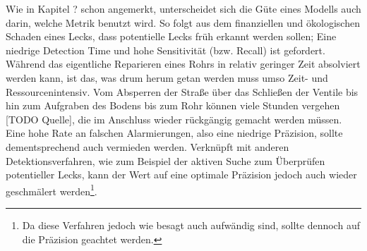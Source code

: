 Wie in Kapitel ? schon angemerkt, unterscheidet sich die Güte eines Modells auch darin, welche Metrik
 benutzt wird. So folgt aus dem finanziellen und ökologischen Schaden eines Lecks, dass potentielle Lecks
 früh erkannt werden sollen; Eine niedrige Detection Time und hohe Sensitivität (bzw. Recall) ist gefordert.
 Während das eigentliche Reparieren eines Rohrs in relativ geringer Zeit absolviert werden kann, ist das, was
 drum herum getan werden muss umso Zeit- und Ressourcenintensiv. Vom Absperren der Straße über das Schließen
 der Ventile bis hin zum Aufgraben des Bodens bis zum Rohr können viele Stunden vergehen [TODO Quelle], die
 im Anschluss wieder rückgängig gemacht werden müssen. Eine hohe Rate an falschen Alarmierungen, also eine
 niedrige Präzision, sollte dementsprechend auch vermieden werden. Verknüpft mit anderen Detektionsverfahren,
 wie zum Beispiel der aktiven Suche zum Überprüfen potentieller Lecks, kann der Wert auf eine optimale Präzision
 jedoch auch wieder geschmälert werden\footnote{Da diese Verfahren jedoch wie besagt auch aufwändig sind, sollte
 dennoch auf die Präzision geachtet werden.}.

